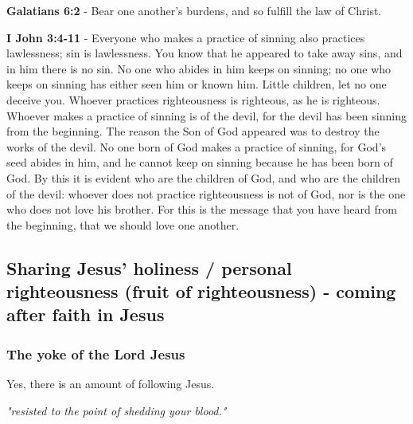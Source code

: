 \documentclass[11pt]{article}
\begin{document}
\textbf{Galatians 6:2} - Bear one another's burdens, and so fulfill the law of Christ.

\textbf{I John 3:4-11} - Everyone who makes a practice of sinning also practices lawlessness; sin is lawlessness. You know that he appeared to take away sins, and in him there is no sin. No one who abides in him keeps on sinning; no one who keeps on sinning has either seen him or known him. Little children, let no one deceive you. Whoever practices righteousness is righteous, as he is righteous. Whoever makes a practice of sinning is of the devil, for the devil has been sinning from the beginning. The reason the Son of God appeared was to destroy the works of the devil. No one born of God makes a practice of sinning, for God's seed abides in him, and he cannot keep on sinning because he has been born of God. By this it is evident who are the children of God, and who are the children of the devil: whoever does not practice righteousness is not of God, nor is the one who does not love his brother. For this is the message that you have heard from the beginning, that we should love one another.

\subsection{Sharing Jesus' holiness / personal righteousness (fruit of righteousness) - coming \textbf{after} faith in Jesus}
\label{sec:orge3a74e4}
\subsubsection{The yoke of the Lord Jesus}
\label{sec:org0004c0a}
Yes, there is an amount of following Jesus.

\emph{"resisted to the point of shedding your blood."}
\end{document}
